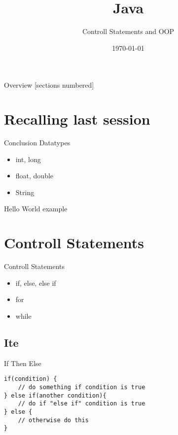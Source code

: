 


\title{Java}
\subtitle{Controll Statements and OOP}
\date{\today}



\begin{frame}
	\titlepage
\end{frame}
\begin{frame}{Overview}
	[sections numbered]
	\tableofcontents
\end{frame}

\section{Recalling last session}
\begin{frame}{Conclusion}
	Datatypes
	\begin{itemize}
		\item int, long
		\item float, double
		\item String
	\end{itemize}
	Hello World example
\end{frame}

\section{Controll Statements}
\begin{frame}{Controll Statements}
	
	\begin{itemize}
		\item if, else, else if
		\item for
		\item while
	\end{itemize}
		
\end{frame}

\subsection{Ite}
\begin{frame}[fragile]{{\huge I}f {\huge T}hen {\huge E}lse}
\begin{lstlisting}
if(condition) {
	// do something if condition is true
} else if(another condition){
	// do if "else if" condition is true 
} else {
	// otherwise do this
}
\end{lstlisting}
\end{frame}

